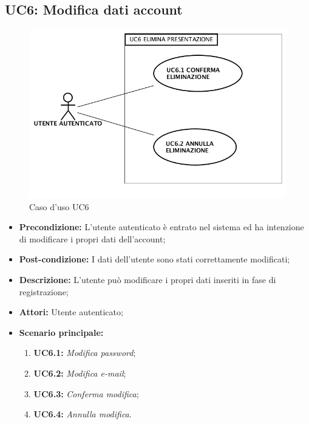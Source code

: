 \newpage
\subsection{ UC6: Modifica dati account}

\begin{figure}[h]
	\begin{center}
	\includegraphics[scale=0.4]{diagram/UC6.png}
	\caption{Caso d'uso UC6}
	\end{center}
\end{figure}
\begin{itemize}
	\item \textbf{Precondizione:} L’utente autenticato è entrato nel sistema ed ha intenzione di modificare i propri dati dell’account;
	\item \textbf{Post-condizione:} I dati dell’utente sono stati correttamente modificati;
	\item \textbf{Descrizione:} L’utente può modificare i propri dati inseriti in fase di registrazione;
	\item \textbf{Attori:} Utente autenticato;
	\item \textbf{Scenario principale:}
	\begin{enumerate}
		\item \textbf{ UC6.1:} \textit{ Modifica password};
		\item \textbf{ UC6.2:} \textit{ Modifica e-mail};
		\item \textbf{ UC6.3:} \textit{ Conferma modifica};
		\item \textbf{ UC6.4:} \textit{ Annulla modifica}.
	\end{enumerate}
\end{itemize}

